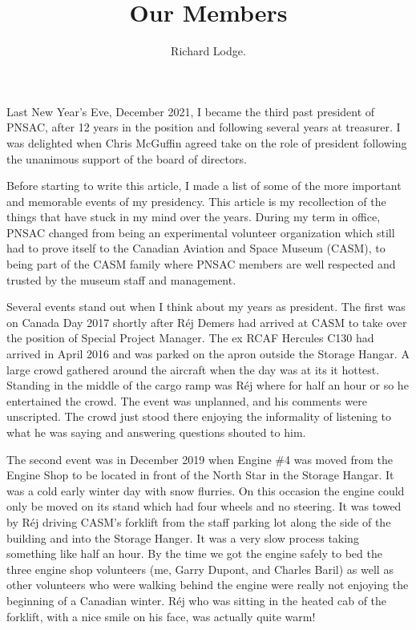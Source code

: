 %


\title{Our Members}
\author{Richard Lodge.}

\maketitle

Last New Year's Eve, December 2021, I became the third past president of PNSAC, after 12 years in the position and following several years at treasurer. I was delighted when Chris McGuffin agreed take on the role of president following the unanimous support of the board of directors.

Before starting to write this article, I made a list of some of the more important and memorable events of my presidency. This article is my recollection of the things that have stuck in my mind over the years. During my term in office, PNSAC changed from being an experimental volunteer organization which still had to prove itself to the Canadian Aviation and Space Museum (CASM), to being part of the CASM family where PNSAC members are well respected and trusted by the museum staff and management.

Several events stand out when I think about my years as president. The first was on Canada Day 2017 shortly after R\'{e}j Demers had arrived at CASM to take over the position of Special Project Manager. The ex RCAF Hercules C130 had arrived in April 2016 and was parked on the apron outside the Storage Hangar.  A large crowd gathered around the aircraft when the day was at its it hottest.  Standing in the middle of the cargo ramp was R\'{e}j where for half an hour or so he entertained the crowd.  The event was unplanned, and his comments were unscripted. The crowd just stood there enjoying the informality of listening to what he was saying and answering questions shouted to him.

The second event was in December 2019 when Engine \#4 was moved from the Engine Shop to be located in front of the North Star in the Storage Hangar. It was a cold early winter day with snow flurries. On this occasion the engine could only be moved on its stand which had four wheels and no steering. It was towed by R\'{e}j driving CASM's forklift from the staff parking lot along the side of the building and into the Storage Hanger. It was a very slow process taking something like half an hour. By the time we got the engine safely to bed the three engine shop volunteers (me, Garry Dupont, and Charles Baril) as well as other volunteers who were walking behind the engine were really not enjoying the beginning of a Canadian winter. R\'{e}j who was sitting in the heated cab of the forklift, with a nice smile on his face, was actually quite warm! 

